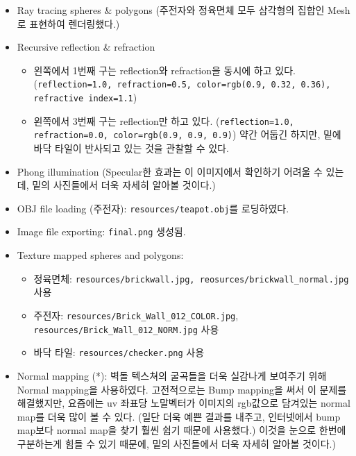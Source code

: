 \documentclass[11pt, a4paper]{article}
\begin{document}
\begin{itemize}
  \item Ray tracing spheres \& polygons (주전자와 정육면체 모두 삼각형의 집합인 Mesh로 표현하여 렌더링했다.)

  \item Recursive reflection \& refraction
    \begin{itemize}
      \item 왼쪽에서 1번째 구는 reflection와 refraction을 동시에 하고 있다. (\texttt{reflection=1.0, refraction=0.5, color=rgb(0.9, 0.32, 0.36), refractive index=1.1})
      \item 왼쪽에서 3번째 구는 reflection만 하고 있다. (\texttt{reflection=1.0, refraction=0.0, color=rgb(0.9, 0.9, 0.9)}) 약간 어둡긴 하지만, 밑에 바닥 타일이 반사되고 있는 것을 관찰할 수 있다.
    \end{itemize}

  \item Phong illumination (Specular한 효과는 이 이미지에서 확인하기 어려울 수 있는데, 밑의 사진들에서 더욱 자세히 알아볼 것이다.)

  \item OBJ file loading (주전자): \texttt{resources/teapot.obj}를 로딩하였다.

  \item Image file exporting: \texttt{final.png} 생성됨.

  \item Texture mapped spheres and polygons:
    \begin{itemize}
      \item 정육면체: \texttt{resources/brickwall.jpg, reosurces/brickwall\_normal.jpg} 사용
      \item 주전자: \texttt{resources/Brick\_Wall\_012\_COLOR.jpg}, \texttt{resources/Brick\_Wall\_012\_NORM.jpg} 사용
      \item 바닥 타일: \texttt{resources/checker.png} 사용
    \end{itemize}

  \item Normal mapping (*): 벽돌 텍스쳐의 굴곡들을 더욱 실감나게 보여주기 위해 Normal mapping을 사용하였다. 고전적으로는 Bump mapping을 써서 이 문제를 해결했지만, 요즘에는 uv 좌표당 노말벡터가 이미지의 rgb값으로 담겨있는 normal map를 더욱 많이 볼 수 있다. (일단 더욱 예쁜 결과를 내주고, 인터넷에서 bump map보다 normal map을 찾기 훨씬 쉽기 때문에 사용했다.) 이것을 눈으로 한번에 구분하는게 힘들 수 있기 때문에, 밑의 사진들에서 더욱 자세히 알아볼 것이다.)


\end{itemize}
\end{document}
